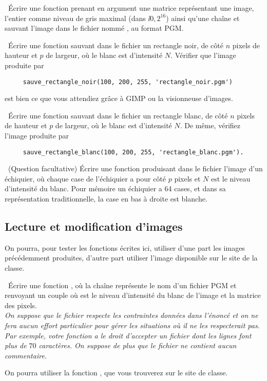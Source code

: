 \question\ Écrire une fonction  prenant en argument
  une matrice  représentant une image, l'entier  comme
  niveau de gris maximal (dans $\ii{0,2^{16}}$) ainsi qu'une chaîne  et
  sauvant l'image dans le fichier nommé , au format PGM.
  
\question\ Écrire une fonction 
  sauvant dans le fichier  un rectangle noir, de côté
  $n$ pixels de hauteur et $p$ de largeur, où le blanc est
  d'intensité $N$. Vérifier que l'image produite par
   \begin{lstlisting}
     sauve_rectangle_noir(100, 200, 255, 'rectangle_noir.pgm')
   \end{lstlisting}
  est bien ce que   vous attendiez grâce à GIMP ou la visionneuse d'images.
  
\question\ Écrire une fonction
   sauvant dans le fichier    un rectangle blanc, de côté $n$ pixels de hauteur et $p$ de
   largeur, où le blanc est d'intensité $N$. De même, vérifiez l'image
   produite par
   \begin{lstlisting}
     sauve_rectangle_blanc(100, 200, 255, 'rectangle_blanc.pgm'). 
   \end{lstlisting}
   
\question\ (Question facultative) Écrire une fonction  produisant
   dans le fichier  l'image d'un échiquier, où chaque case de
   l'échiquier a pour côté $p$ pixels et $N$ est le niveau d'intensité
   du blanc. Pour mémoire un échiquier a 64 cases, et dans sa
   représentation traditionnelle, la case en bas à droite est blanche.


 \subsection{Lecture et modification d'images}
 
 On pourra, pour tester les fonctions écrites ici, utiliser d'une part
 les images précédemment produites, d'autre part utiliser l'image
 disponible sur le site de la classe.

\question\ Écrire une fonction , où
   la chaîne  représente le nom  d'un fichier PGM et renvoyant un couple  où  est
   le niveau d'intensité du blanc de l'image et  la matrice des
   pixels. \\ 
   \emph{On suppose que le fichier respecte les contraintes données
   dans l'énoncé et on ne fera aucun effort particulier pour gérer les
   situations où il ne les respecterait pas. \\
   Par exemple, votre
   fonction a le droit d'accepter un fichier dont les lignes
   font plus de $70$ caractères. On suppose de plus que le fichier ne
   contient aucun commentaire.}\\
\begin{rem}
  On pourra utiliser la fonction , que vous trouverez sur le site de classe.
\end{rem}

